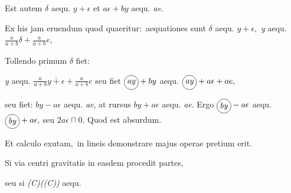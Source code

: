 %
Est autem $\delta$ aequ. $y + \epsilon$
et $a\epsilon + by$ aequ. \textit{ae}.
\rule[-3mm]{0pt}{6mm}%
%
Ex his jam eruendum
quod quaeritur\lbrack:\rbrack\
aequationes\protect{}
sunt $\delta$ aequ. $y + \epsilon,$
\textit{y} aequ. $\displaystyle\frac{a}{a+b}\delta + \displaystyle\frac{a}{a+b}e,$
\rule[-3mm]{0pt}{6mm}%
%
Tollendo primum $\delta$ fiet:
\rule[-3mm]{0pt}{6mm}%
\textit{y} aequ. $\displaystyle\frac{a}{a+b}\overline{y+\epsilon}+\displaystyle\frac{a}{a+b}e$ seu fiet $\raisebox{-2.6mm}{{\def\firstcircle{(0,0) circle (0.3cm)}\begin{tikzpicture}\draw \firstcircle node {\textit{ay}};\end{tikzpicture}}} + by$ aequ. $\raisebox{-2.6mm}{{\def\firstcircle{(0,0) circle (0.3cm)}\begin{tikzpicture}\draw \firstcircle node {\textit{ay}};\end{tikzpicture}}} + a\epsilon + ae,$
\rule[-3mm]{0pt}{6mm}%
seu fiet:
$by - a\epsilon$ aequ. \textit{ae},
at rursus $by + a\epsilon$ aequ. \textit{ae}.
%
Ergo $\raisebox{-2.6mm}{{\def\firstcircle{(0,0) circle (0.3cm)}\begin{tikzpicture}\draw \firstcircle node {\textit{by}};\end{tikzpicture}}} - a\epsilon$ aequ. $\raisebox{-2.6mm}{{\def\firstcircle{(0,0) circle (0.3cm)}\begin{tikzpicture}\draw \firstcircle node {\textit{by}};\end{tikzpicture}}} + a\epsilon,$
seu $2a\epsilon \sqcap 0.$
%
Quod est absurdum.%
\protect{}
\rule[-3mm]{0pt}{5mm}%
\pend%
%
\pstart%
Et
%
%
calculo\protect{}
exutam\lbrack,\rbrack\
in lineis demonstrare majus operae pretium erit.
\rule[-3mm]{0pt}{6mm}%
\quad
Si via centri gravitatis%
\protect{}%
\protect{}
in easdem procedit partes,
\rule[-3mm]{0pt}{6mm}%
seu si \textit{(C)((C))} aequ.
%
